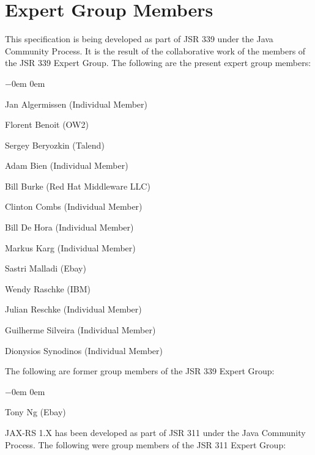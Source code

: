 \section{Expert Group Members} 
\label{expert_group}

This specification is being developed as part of JSR 339 under the Java Community Process. It is the result of the collaborative work of the members of the JSR 339 Expert Group. The following are the present expert group members:

\begin{list}{$-$}{\parsep 0em  0em}
\item Jan Algermissen (Individual Member)
\item Florent Benoit (OW2)
\item Sergey Beryozkin (Talend) 
\item Adam Bien (Individual Member) 
\item Bill Burke (Red Hat Middleware LLC) 
\item Clinton Combs (Individual Member) 
\item Bill De Hora (Individual Member)  
\item Markus Karg (Individual Member) 
\item Sastri Malladi (Ebay) 
\item Wendy Raschke (IBM)
\item Julian Reschke (Individual Member)
\item Guilherme Silveira (Individual Member) 
\item Dionysios Synodinos (Individual Member)
\end{list}

The following are former group members of the JSR 339 Expert Group:

\begin{list}{$-$}{\parsep 0em  0em}
\item Tony Ng (Ebay)
\end{list}

JAX-RS 1.X has been developed as part of JSR 311 under the Java Community Process. The following were group members of the JSR 311 Expert Group:

